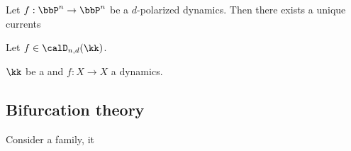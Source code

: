 \begin{lemma}[label=\labelNFM{lem:existence-of-green-currents-and-functions-for-dynamics-on-pn}, status=draft, tag=0000000]
	Let $f: \bbP^n \to \bbP^n$ be a $d$-polarized dynamics.
	Then there exists a unique currents \Yang{}
\end{lemma}


\begin{definition}[label=\labelNFM{def:equilibrium-measure}, status=draft, tag=0000000]
	Let $f \in \calD_{n,d}(\kk)$.

	$\kk$ be a and $f:X \to X$ a dynamics.
	\Yang{}
\end{definition}











\subsection[status=draft,tag=0000000,label=\labelNFM{subsec:bifurcation-theory}]{Bifurcation theory}

\begin{definition}[label=\labelNFM{def:bifurcation-measure}, status=draft, tag=0000000]
	Consider a family, it \Yang{}
	\Yang{}
\end{definition}









